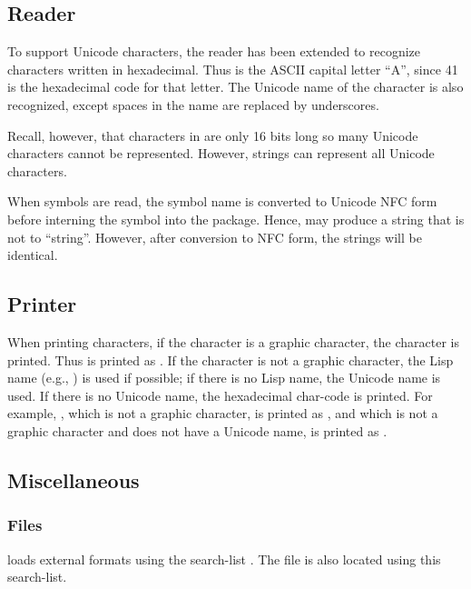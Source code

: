 \subsection{Reader}

To support Unicode characters, the reader has been extended to
recognize characters written in hexadecimal.  Thus  is
the ASCII capital letter ``A'', since 41 is the hexadecimal code for
that letter.  The Unicode name of the character is also recognized,
except spaces in the name are replaced by underscores.

Recall, however, that characters in \cmucl{} are only 16 bits long so
many Unicode characters cannot be represented.  However, strings can
represent all Unicode characters.

When symbols are read, the symbol name is converted to Unicode NFC
form before interning the symbol into the package.  Hence,
 may produce a string that is
not  to ``string''.  However, after conversion to NFC
form, the strings will be identical.

\subsection{Printer}

When printing characters, if the character is a graphic character, the
character is printed.  Thus  is printed as
.  If the character is not a graphic character, the Lisp
name (e.g., ) is used if possible;
if there is no Lisp name, the Unicode name is used.  If there is no
Unicode name, the hexadecimal char-code is
printed.  For example, , which is not a graphic
character, is printed as ,
and  which is not a graphic character and does not have a
Unicode name, is printed as .

\subsection{Miscellaneous}


\subsubsection{Files}

\cmucl{} loads external formats using the search-list
.  The  file is also located using
this search-list.

